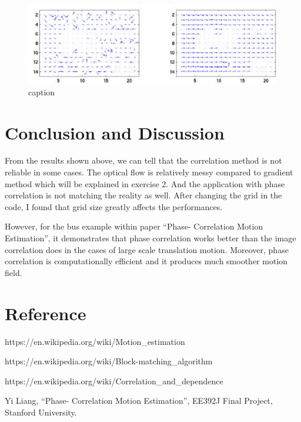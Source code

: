 \documentclass[11pt]{article}
\makeatletter
\def\maxwidth{\ifdim\Gin@nat@width>\linewidth\linewidth
    \else\Gin@nat@width\fi}
\let\Oldincludegraphics\includegraphics
\renewcommand{\includegraphics}[1]{\Oldincludegraphics[width=.8\maxwidth]{#1}}
\makeatother
\begin{document}
\begin{figure}
\centering
\includegraphics{ex.jpg}
\caption{caption}
\end{figure}

    \hypertarget{conclusion-and-discussion}{%
\section{Conclusion and Discussion}\label{conclusion-and-discussion}}

    From the results shown above, we can tell that the correlation method is
not reliable in some cases. The optical flow is relatively messy
compared to gradient method which will be explained in exercise 2. And
the application with phase correlation is not matching the reality as
well. After changing the grid in the code, I found that grid size
greatly affects the performances.

However, for the bus example within paper ``Phase- Correlation Motion
Estimation'', it demonstrates that phase correlation works better than
the image correlation does in the cases of large scale translation
motion. Moreover, phase correlation is computationally efficient and it
produces much smoother motion field.

    \hypertarget{reference}{%
\section{Reference}\label{reference}}

    https://en.wikipedia.org/wiki/Motion\_estimation

https://en.wikipedia.org/wiki/Block-matching\_algorithm

https://en.wikipedia.org/wiki/Correlation\_and\_dependence

Yi Liang, ``Phase- Correlation Motion Estimation'', EE392J Final
Project, Stanford University.


    
    
    
    
\end{document}
